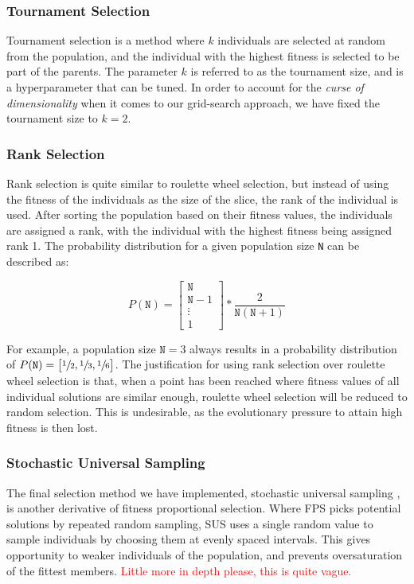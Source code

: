 \documentclass{article}
\newcommand{\todo}[1]{\textcolor{red}{#1}}
\begin{document}
\subsubsection*{Tournament Selection}
\label{subsubsec:ga_sel_ts}
Tournament selection \cite{tournament} is a method where $k$ individuals are selected at random from the population, and the individual with the highest fitness is selected to be part of the parents.
The parameter $k$ is referred to as the tournament size, and is a hyperparameter that can be tuned.
In order to account for the \textit{curse of dimensionality} when it comes to our grid-search approach, we have fixed the tournament size to $k=2$.

\subsubsection*{Rank Selection}
\label{subsubsec:ga_sel_rs}
Rank selection \cite{rank} is quite similar to roulette wheel selection, but instead of using the fitness of the individuals as the size of the slice, the rank of the individual is used.
After sorting the population based on their fitness values, the individuals are assigned a rank, with the individual with the highest fitness being assigned rank 1.
The probability distribution for a given population size \texttt{N} can be described as:

$$ P(\texttt{N}) = \begin{bmatrix} \texttt{N} \\ \texttt{N}-1 \\ \vdots \\ 1 \end{bmatrix} * \frac{2}{\texttt{N}(\texttt{N}+1)}$$

For example, a population size $\texttt{N}=3$ always results in a probability distribution of
$P(\texttt{N}) = \begin{bmatrix} \sfrac{1}{2}, \sfrac{1}{3}, \sfrac{1}{6} \end{bmatrix}$.
The justification for using rank selection over roulette wheel selection is that, when a point has been reached where fitness values of all individual solutions are similar enough, roulette wheel selection will be reduced to random selection.
This is undesirable, as the evolutionary pressure to attain high fitness is then lost.

\subsubsection*{Stochastic Universal Sampling}
\label{subsubsec:ga_sel_sus}
The final selection method we have implemented, stochastic universal sampling \cite{sus}, is another derivative of fitness proportional selection.
Where FPS picks potential solutions by repeated random sampling, SUS uses a single random value to sample individuals by choosing them at evenly spaced intervals.
This gives opportunity to weaker individuals of the population, and prevents oversaturation of the fittest members.
\todo{Little more in depth please, this is quite vague.}
\end{document}

